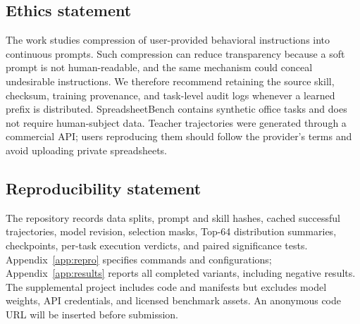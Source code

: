 \documentclass{article}
\begin{document}
\subsection*{Ethics statement}
The work studies compression of user-provided behavioral instructions into continuous prompts.  Such compression can reduce transparency because a soft prompt is not human-readable, and the same mechanism could conceal undesirable instructions.  We therefore recommend retaining the source skill, checksum, training provenance, and task-level audit logs whenever a learned prefix is distributed.  SpreadsheetBench contains synthetic office tasks and does not require human-subject data.  Teacher trajectories were generated through a commercial API; users reproducing them should follow the provider's terms and avoid uploading private spreadsheets.

\subsection*{Reproducibility statement}
The repository records data splits, prompt and skill hashes, cached successful trajectories, model revision, selection masks, Top-64 distribution summaries, checkpoints, per-task execution verdicts, and paired significance tests.  Appendix~\ref{app:repro} specifies commands and configurations; Appendix~\ref{app:results} reports all completed variants, including negative results.  The supplemental project includes code and manifests but excludes model weights, API credentials, and licensed benchmark assets.  An anonymous code URL will be inserted before submission.




\appendix

\end{document}
